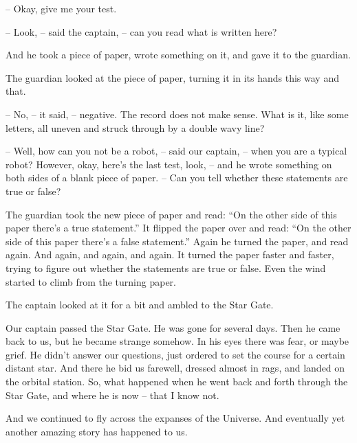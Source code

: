 \documentclass[ebook,oneside,final,openright]{memoir}
\begin{document}
– Okay, give me your test.\par
– Look, – said the captain, – can you read what is written here?\par
And he took a piece of paper, wrote something on it, and gave it to the guardian.\par
The guardian looked at the piece of paper, turning it in its hands this way and that.\par
– No, – it said, – negative. The record does not make sense. What is it, like some letters, all uneven and struck through by a double wavy line?\par
– Well, how can you not be a robot, – said our captain, – when you are a typical robot? However, okay, here’s the last test, look, – and he wrote something on both sides of a blank piece of paper. – Can you tell whether these statements are true or false?\par
\par
The guardian took the new piece of paper and read: “On the other side of this paper there’s a true statement.” It flipped the paper over and read: “On the other side of this paper there’s a false statement.” Again he turned the paper, and read again. And again, and again, and again. It turned the paper faster and faster, trying to figure out whether the statements are true or false. Even the wind started to climb from the turning paper.\par
\par
The captain looked at it for a bit and ambled to the Star Gate.\par
Our captain passed the Star Gate. He was gone for several days. Then he came back to us, but he became strange somehow. In his eyes there was fear, or maybe grief. He didn’t answer our questions, just ordered to set the course for a certain distant star. And there he bid us farewell, dressed almost in rags, and landed on the orbital station. So, what happened when he went back and forth through the Star Gate, and where he is now – that I know not. \par
\par
 And we continued to fly across the expanses of the Universe. And eventually yet another amazing story has happened to us.
\end{document}
